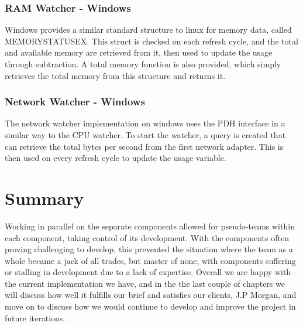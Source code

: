 \documentclass{l3proj}
\begin{document}
\subsubsection{RAM Watcher - Windows}

Windows provides a similar standard structure to linux for memory data, called MEMORYSTATUSEX. This struct is checked on each refresh cycle, and the total and available memory are retrieved from it, then used to update the usage through subtraction. A total memory function is also provided, which simply retrieves the total memory from this structure and returns it.

\subsubsection{Network Watcher - Windows}

The network watcher implementation on windows uses the PDH interface in a similar way to the CPU watcher. To start the watcher, a query is created that can retrieve the total bytes per second from the first network adapter. This is then used on every refresh cycle to update the usage variable.


\section{Summary}

Working in parallel on the separate components allowed for pseudo-teams within each component, taking control of its development. With the components often proving challenging to develop, this prevented the situation where the team as a whole became a jack of all trades, but master of none, with components suffering or stalling in development due to a lack of expertise. Overall we are happy with the current implementation we have, and in the the last couple of chapters we will discuss how well it fulfills our brief and satisfies our clients, J.P Morgan, and move on to discuss how we would continue to develop and improve the project in future iterations.


\end{document}
